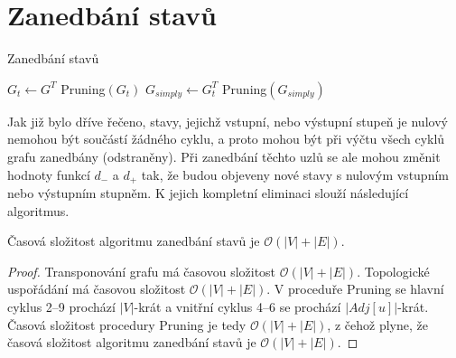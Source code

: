     \section{Zanedbání stavů}
        \begin{algorithm}
            \label{algo:ZanedbaniStavu}
            \DontPrintSemicolon
            \caption{Zanedbání stavů}
            \vspace*{0.5em}

            \vspace*{0.5em}

            $G_t \leftarrow G^T$ 
            Pruning$(G_t)$ 
            $G_{simply} \leftarrow G_t^T$ 
            Pruning$(G_{simply})$ 
            \vspace*{0.5em}


        \end{algorithm}

        Jak již bylo dříve řečeno, stavy, jejichž vstupní, nebo výstupní stupeň je nulový nemohou být součástí žádného cyklu, a proto mohou být při výčtu všech cyklů grafu zanedbány (odstraněny). Při zanedbání těchto uzlů se ale mohou změnit hodnoty funkcí $d_-$ a $d_+$ tak, že budou objeveny nové stavy s nulovým vstupním nebo výstupním stupněm. K jejich kompletní eliminaci slouží následující algoritmus.

        \begin{theorem}
            Časová složitost algoritmu zanedbání stavů je $\mathcal{O}(|V| + |E|)$.
        \end{theorem}

        \begin{proof}
            Transponování grafu má časovou složitost $\mathcal{O}(|V| + |E|)$. Topologické uspořádání má časovou složitost $\mathcal{O}(|V| + |E|)$. V proceduře Pruning se hlavní cyklus 2--9 prochází $|V|$-krát a vnitřní cyklus 4--6 se prochází $|Adj[u]|$-krát. Časová složitost procedury Pruning je tedy $\mathcal{O}(|V| + |E|)$, z čehož plyne, že časová složitost algoritmu zanedbání stavů je $\mathcal{O}(|V| + |E|)$.
        \end{proof}

